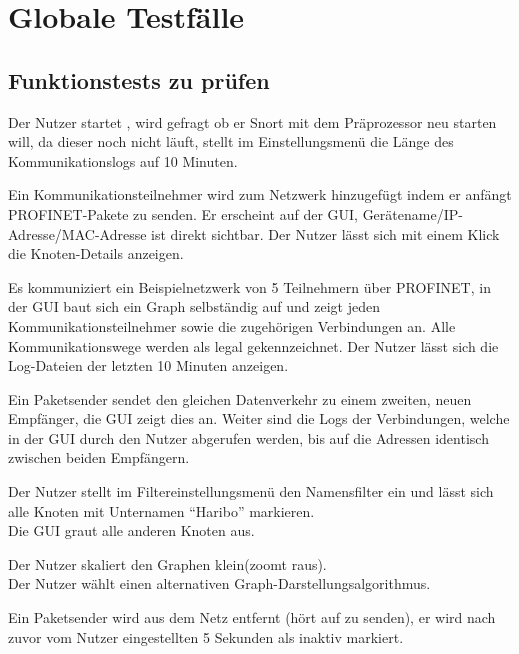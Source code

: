 \chapter{Globale Testfälle}

\section{Funktionstests zu prüfen}

\begin{description}[style=multiline, leftmargin=4cm, labelwidth=4cm]
  \item[\namedlabel{start}{Programm starten}] Der Nutzer startet \programname, wird gefragt ob er Snort mit dem Präprozessor neu starten will, da dieser noch nicht läuft, stellt im Einstellungsmenü die Länge des Kommunikationslogs auf 10 Minuten.
  \item[\namedlabel{addNetNode}{Kommunikationsteilnehmer hinzufügen}] Ein Kommunikationsteilnehmer wird zum Netzwerk hinzugefügt indem er anfängt PROFINET-Pakete zu senden. Er erscheint auf der GUI, Gerätename/IP-Adresse/MAC-Adresse ist direkt sichtbar. Der Nutzer lässt sich mit einem Klick die Knoten-Details anzeigen.
  \item[\namedlabel{normalWatch}{Normale Netzwerküberwachung}] Es kommuniziert ein Beispielnetzwerk von 5 Teilnehmern über PROFINET, in der GUI baut sich ein Graph selbständig auf und zeigt jeden Kommunikationsteilnehmer sowie die zugehörigen Verbindungen an. Alle Kommunikationswege werden als legal gekennzeichnet. Der Nutzer lässt sich die Log-Dateien der letzten 10 Minuten anzeigen.
  \item[\namedlabel{guiDisplay}{Korrekte GUI Darstellung}] Ein Paketsender sendet den gleichen Datenverkehr zu einem zweiten, neuen Empfänger, die GUI zeigt dies an. Weiter sind die Logs der Verbindungen, welche in der GUI durch den Nutzer abgerufen werden, bis auf die Adressen identisch zwischen beiden Empfängern.
  \item[\namedlabel{filter}{Filter anwenden}] Der Nutzer stellt im Filtereinstellungsmenü den Namensfilter ein und lässt sich alle Knoten mit Unternamen “Haribo” markieren. \\Die GUI graut alle anderen Knoten aus.
  \item[\namedlabel{guiChanging}{Graph verändern}] Der Nutzer skaliert den Graphen klein(zoomt raus). \\Der Nutzer wählt einen alternativen Graph-Darstellungsalgorithmus.
  \item[\namedlabel{inactive}{Netzteilnehmer wird inaktiv}] Ein Paketsender wird aus dem Netz entfernt (hört auf zu senden), er wird nach zuvor vom Nutzer eingestellten 5 Sekunden als inaktiv markiert.

\end{description}
